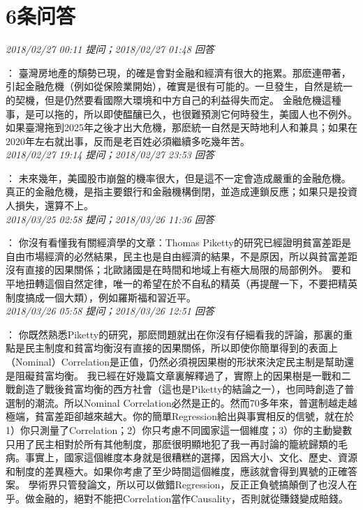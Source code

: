 \documentclass[twocolumn]{ctexart}
\begin{document}
\section{6条问答}

\textit{\hfill\noindent\small 2018/02/27 00:11 提问；2018/02/27 01:48 回答}

：
臺灣房地產的頹勢已現，的確是會對金融和經濟有很大的拖累。那麽連帶著，引起金融危機（例如從保險業開始），確實是很有可能的。一旦發生，自然是統一的契機，但是仍然要看國際大環境和中方自己的利益得失而定。
金融危機這種事，是可以拖的，所以即使醖釀已久，也很難預測它何時發生，美國人也不例外。
如果臺灣拖到2025年之後才出大危機，那麽統一自然是天時地利人和兼具；如果在2020年左右就出事，反而是老百姓必須繼續多吃幾年苦。
\\

\textit{\hfill\noindent\small 2018/02/27 19:14 提问；2018/02/27 23:53 回答}

：
未來幾年，美國股市崩盤的機率很大，但是這不一定會造成嚴重的金融危機。
真正的金融危機，是指主要銀行和金融機構倒閉，並造成連鎖反應；如果只是投資人損失，還算不上。
\\

\textit{\hfill\noindent\small 2018/03/25 02:58 提问；2018/03/26 11:36 回答}

：
你沒有看懂我有關經濟學的文章：Thomas Piketty的研究已經證明貧富差距是自由市場經濟的必然結果，民主也是自由經濟的結果，不是原因，所以與貧富差距沒有直接的因果關係；北歐諸國是在時間和地域上有極大局限的局部例外。 
要和平地扭轉這個自然定律，唯一的希望在於不自私的精英（再提醒一下，不要把精英制度搞成一個大類），例如羅斯福和習近平。
\\

\textit{\hfill\noindent\small 2018/03/26 05:58 提问；2018/03/26 12:51 回答}

：
你既然熟悉Piketty的研究，那麽問題就出在你沒有仔細看我的評論，那裏的重點是民主制度和貧富均衡沒有直接的因果關係，所以即使你簡單得到的表面上（Nominal）Correlation是正值，仍然必須視因果樹的形狀來決定民主制是幫助還是阻礙貧富均衡。 
我已經在好幾篇文章裏解釋過了，實際上的因果樹是一戰和二戰創造了戰後貧富均衡的西方社會（這也是Piketty的結論之一），也同時創造了普選制的潮流。所以Nominal Correlation必然是正的。然而70多年來，普選制越走越極端，貧富差距卻越來越大。你的簡單Regression給出與事實相反的信號，就在於1）你只測量了Correlation；2）你只考慮不同國家這一個維度；3）你的主動變數只用了民主相對於所有其他制度，那麽很明顯地犯了我一再討論的籠統歸類的毛病。事實上，國家這個維度本身就是很糟糕的選擇，因爲大小、文化、歷史、資源和制度的差異極大。如果你考慮了至少時間這個維度，應該就會得到異號的正確答案。 
學術界只管發論文，所以可以做錯Regression，反正正負號搞顛倒了也沒人在乎。做金融的，絕對不能把Correlation當作Causality，否則就從賺錢變成賠錢。
\\
\end{document}
